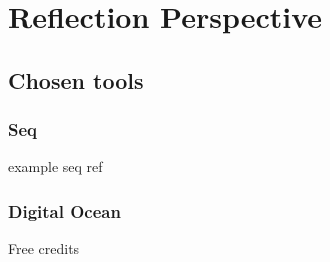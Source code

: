 \section{Reflection Perspective}

\subsection{Chosen tools}

\subsubsection{Seq}

example seq ref \cite{seq}

\subsubsection{Digital Ocean}

Free credits
